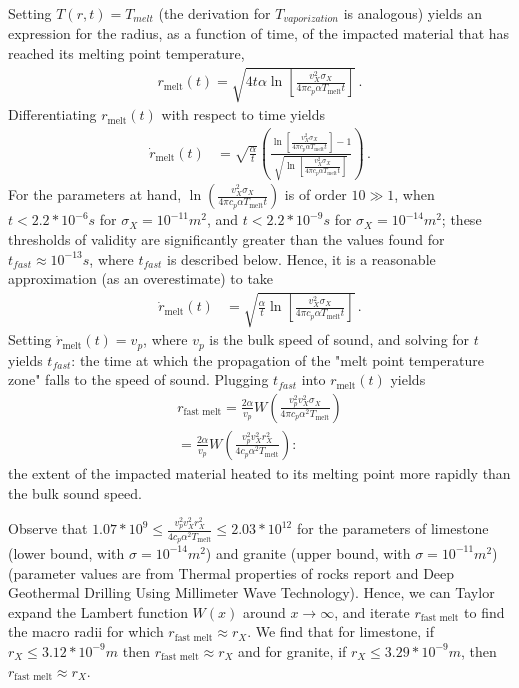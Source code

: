 \documentclass[prd,reprint,10pt]{revtex4-1}
\newcommand*\te[1]{\text{#1}}
\newcommand*\p[1]{\left(#1\right)}
\newcommand*\ps[1]{\left[#1\right]}
\newcommand*\f[2]{\frac{#1}{#2}}
\begin{document}
\par Setting $T(r,t) = T_{melt}$ (the derivation for $T_{vaporization}$ is analogous) yields an expression for the radius, as a function of time, of the impacted material that has reached its melting point temperature,
\begin{align}
r_\te{melt}(t) = \sqrt{4t\alpha\ln\ps{\f{v_X^2\sigma_X}{4 \pi c_p \alpha T_\te{melt} t}}}\,.
\end{align} 
Differentiating $r_\te{melt}(t)$ with respect to time yields
\begin{align}
\dot r_\te{melt}(t) &=\sqrt{\f{\alpha}{t}}\p{\f{\ln\ps{\f{v_X^2\sigma_X}{4 \pi c_p \alpha T_\te{melt} t}} - 1}{\sqrt{\ln\ps{\f{v_X^2\sigma_X}{4 \pi c_p \alpha T_\te{melt} t}}}}}\,.
\end{align}
For the parameters at hand, $\ln\p{\f{v_X^2\sigma_X}{4 \pi c_p \alpha T_\te{melt} t}}$ is of order $10 \gg 1$, when $t < 2.2*10^{-6} s$ for $\sigma_X = 10^{-11} m^2$, and $t < 2.2*10^{-9} s$ for $\sigma_X = 10^{-14} m^2$; these thresholds of validity are significantly greater than the values found for $t_{fast} \approx 10^{-13} s$, where $t_{fast}$ is described below.  Hence, it is a reasonable approximation (as an overestimate) to take
\begin{align}
\dot r_\te{melt}(t) &=\sqrt{\f{\alpha}{t}\ln\ps{\f{v_X^2\sigma_X}{4 \pi c_p \alpha T_\te{melt} t}}}\,.
\end{align}
Setting $\dot r_\te{melt}(t) = v_p$, where $v_p$ is the bulk speed of sound, and solving for $t$ yields $t_{fast}$: the time at which the propagation of the "melt point temperature zone" falls to the speed of sound.  Plugging $t_{fast}$ into $r_\te{melt}(t)$ yields
\begin{align}
r_\te{fast melt} =  \frac{2\alpha}{v_p}W\p{\frac{v_p^2 v_X^2 \sigma_X}{4 \pi c_p \alpha^2 T_\te{melt}}}
\\
= \frac{2\alpha}{v_p}W\p{\frac{v_p^2 v_X^2 r_X^2}{4 c_p \alpha^2 T_\te{melt}}}:
\end{align}the extent of the impacted material heated to its melting point more rapidly than the bulk sound speed. 

\par Observe that $ 1.07*10^9 \leq \frac{v_p^2 v_X^2 r_X^2}{4 c_p \alpha^2 T_\te{melt}} \leq 2.03*10^{12}$ for the parameters of limestone (lower bound, with $\sigma =10^{-14} m^2$) and granite (upper bound, with $\sigma = 10^{-11} m^2$) (parameter values are from Thermal properties of rocks report and Deep Geothermal Drilling Using Millimeter Wave Technology).  Hence, we can Taylor expand the Lambert function $W(x)$ around $x\to \infty$, and iterate $r_\te{fast melt}$ to find the macro radii for which $r_\te{fast melt} \approx r_X$.  We find that for limestone, if $r_X \leq 3.12*10^{-9} m$ then $r_\te{fast melt} \approx r_X$ and for granite, if $r_X \leq 3.29*10^{-9} m$, then $r_\te{fast melt} \approx r_X$.
\end{document}

